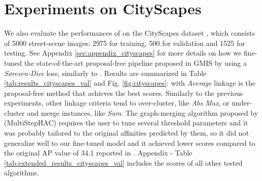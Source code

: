 \section{Experiments on CityScapes}\label{sec:cityscapes_exp}
We also evaluate the performances of \algname{} on the CityScapes dataset \cite{cordts2016cityscapes}, which consists of 5000 street-scene images: 2975 for training, 500 for validation and 1525 for testing.
See Appendix \ref{sec:appendix_cityscapes} for more details on how we fine-tuned the state-of-the-art proposal-free pipeline proposed in GMIS \cite{liu2018affinity} by using a \emph{S\o resen-Dice} loss, similarly to \cite{wolf2018mutex}.
Results are summarized in Table \ref{tab:results_cityscapes_val} and Fig. \ref{fig:cityscapes}: \algname{} with \emph{Average} linkage is the proposal-free method that achieves the best scores.
 Similarly to the previous experiments, other linkage criteria tend to over-cluster, like \emph{Abs Max}, or under-cluster and merge instances, like \emph{Sum}. The graph-merging algorithm proposed by \cite{liu2018affinity} (MultiStepHAC) requires the user to tune several threshold parameters and it was probably tailored to the original affinities predicted by them, so it did not generalize well to our fine-tuned model and it achieved lower scores compared to the original AP value of 34.1 reported in \cite{liu2018affinity}.  
Appendix - Table \ref{tab:extended_results_cityscapes_val} includes the scores of all other tested \algname{} algorithms.
\captionsetup[subtable]{labelformat=simple, labelsep=space, justification=centering, singlelinecheck=off}
\renewcommand*{\thesubtable}{(\alph{subtable})}
